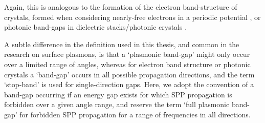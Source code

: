 Again, this is analogous to the formation of the electron band-structure of crystals, formed when considering nearly-free electrons in a periodic potential \cite{kittel1996introduction}, or photonic band-gaps in dielectric stacks/photonic crystals \cite{Search1993}. 

A subtle difference in the definition used in this thesis, and common in the research on surface plasmons, is that a `plasmonic band-gap' might only occur over a limited range of angles, whereas for electron band structure or photonic crystals a `band-gap' occurs in all possible propagation directions, and the term `stop-band' is used for single-direction gaps. Here, we adopt the convention of a band-gap occurring if an energy gap exists for which SPP propagation is forbidden over a given angle range, and reserve the term `full plasmonic band-gap' for forbidden SPP propagation for a range of frequencies in all directions.


